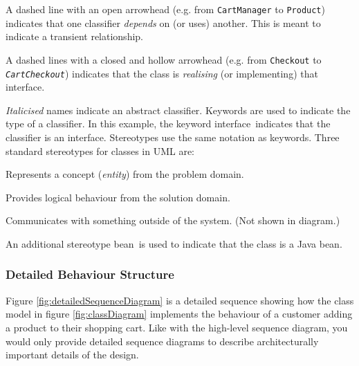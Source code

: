 A dashed line with an open arrowhead (e.g. from \texttt{CartManager} to \texttt{Product})
indicates that one classifier \emph{depends} on (or uses) another. This is meant to indicate a transient relationship.

A dashed lines with a closed and hollow arrowhead (e.g. from \texttt{Checkout} to \texttt{\textsl{CartCheckout}})
indicates that the class is \emph{realising} (or implementing) that interface.

\textit{Italicised} names indicate an abstract classifier. Keywords are used to indicate the type of a classifier.
In this example, the keyword \guillemotleft interface\guillemotright~indicates that the classifier is an interface.
Stereotypes use the same notation as keywords. Three standard stereotypes for classes in UML are:
\begin{description}[nosep,left=5mm]
    \item[\guillemotleft entity\guillemotright] Represents a concept (\emph{entity}) from the problem domain.
    \item[\guillemotleft control\guillemotright] Provides logical behaviour from the solution domain.
    \item[\guillemotleft boundary\guillemotright] Communicates with something outside of the system. (Not shown in diagram.)
\end{description}
An additional stereotype \guillemotleft bean\guillemotright~is used to indicate that the class is a Java bean.

\subsubsection{Detailed Behaviour Structure}\label{sec:detailedBehaviourStruct}
Figure \ref{fig:detailedSequenceDiagram} is a detailed sequence showing how the class model in
figure \ref{fig:classDiagram} implements the behaviour of a customer adding a product to their shopping cart.
Like with the high-level sequence diagram, you would only provide detailed sequence diagrams to describe architecturally important details of the design.

